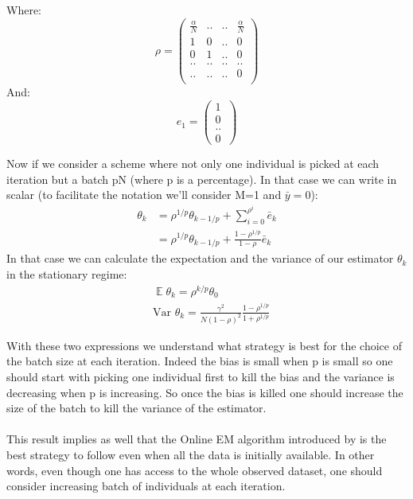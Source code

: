 \documentclass[a4paper]{article}
\theoremstyle{plain}
\DeclareMathOperator*{\E}{\mathbb{E}}
\theoremstyle{plain}
\theoremstyle{definition}
\begin{document}
Where:
\begin{equation}
\rho = \begin{pmatrix} 
\frac{\alpha}{N} & .. & .. & \frac{\alpha}{N} \\
1 & 0 & .. & 0\\
0 & 1 & .. & 0\\
.. & .. & .. & ..\\
.. & .. & .. & 0\\
\end{pmatrix}
\end{equation}
And:
\begin{equation}
e_1 = \begin{pmatrix} 
1\\
0\\
..\\
0\
\end{pmatrix} 
\end{equation}

\noindent Now if we consider a scheme where not only one individual is picked at each iteration but a batch pN (where p is a percentage). In that case we can write in scalar (to facilitate the notation we'll consider M=1 and $\bar{y} = 0$):
\begin{equation}
\begin{split}
\theta_k & = \rho^{1/p} \theta_{k-1/p} + \sum_{i=0}^{\rho^{i}}\bar{e}_k\\
& =  \rho^{1/p} \theta_{k-1/p} + \frac{1-\rho^{1/p}}{1-\rho}\bar{e}_k
\end{split}
\end{equation}
In that case we can calculate the expectation and the variance of our estimator $\theta_k$ in the stationary regime:
\begin{equation}
\begin{split}
& \E \theta_k = \rho^{k/p}\theta_0\\
& \textrm{Var } \theta_k = \frac{\gamma^2}{N(1-\rho)^2}\frac{1-\rho^{1/p}}{1+\rho^{1/p}}
\end{split}
\end{equation}

With these two expressions we understand what strategy is best for the choice of the batch size at each iteration. Indeed the bias is small when p is small so one should start with picking one individual first to kill the bias and the variance is decreasing when p is increasing. So once the bias is killed one should increase the size of the batch to kill the variance of the estimator.\\
\\
This result implies as well that the Online EM algorithm introduced by \citep{cappe} is the best strategy to follow even when all the data is initially available. In other words, even though one has access to the whole observed dataset, one should consider increasing batch of individuals at each iteration.
\end{document}

